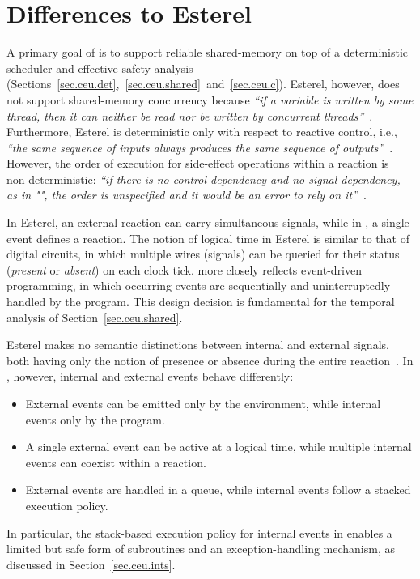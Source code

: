 \section{Differences to Esterel}
\label{sec.ceu.esterel}

A primary goal of \CEU is to support reliable shared-memory on top of a 
deterministic scheduler and effective safety analysis
(Sections~\ref{sec.ceu.det},~\ref{sec.ceu.shared}~and~\ref{sec.ceu.c}).
%
Esterel, however, does not support shared-memory concurrency because \emph{``if 
a variable is written by some thread, then it can neither be read nor be 
written by concurrent threads''}~\cite{esterel.primer}.
%
Furthermore, Esterel is deterministic only with respect to reactive control, 
i.e., \emph{``the same sequence of inputs always produces the same sequence of 
outputs''}~\cite{esterel.primer}.
However, the order of execution for side-effect operations within a reaction is 
non-deterministic: \emph{``if there is no control dependency and no signal 
dependency, as in "", the order is unspecified and 
it would be an error to rely on it''}~\cite{esterel.primer}.
%

In Esterel, an external reaction can carry simultaneous signals, while in \CEU, 
a single event defines a reaction.
%
The notion of logical time in Esterel is similar to that of digital circuits, 
in which multiple wires (signals) can be queried for their status 
(\emph{present} or \emph{absent}) on each clock tick.
%
\CEU more closely reflects event-driven programming, in which occurring events 
are sequentially and uninterruptedly handled by the program.
%
This design decision is fundamental for the temporal analysis of 
Section~\ref{sec.ceu.shared}.%

Esterel makes no semantic distinctions between internal and external signals, 
both having only the notion of presence or absence during the entire 
reaction~\cite{esterel.preemption}.
%
In \CEU, however, internal and external events behave differently:
%
\begin{itemize}
\item External events can be emitted only by the environment, while internal 
events only by the program.
\item A single external event can be active at a logical time, while multiple 
internal events can coexist within a reaction.
\item External events are handled in a queue, while internal events follow a 
stacked execution policy.
\end{itemize}
%
In particular, the stack-based execution policy for internal events in \CEU 
enables a limited but safe form of subroutines and an exception-handling 
mechanism, as discussed in Section~\ref{sec.ceu.ints}.

